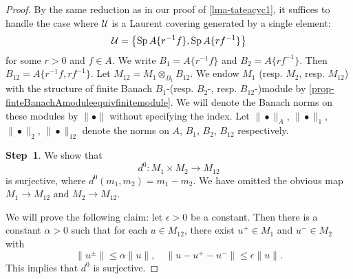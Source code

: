 \begin{proof}
    By the same reduction as in our proof of \cref{lma-tateacyc1}, it suffices to handle the case where $\mathcal{U}$ is a Laurent covering generated by a single element:
    \[
        \mathcal{U}=\left\{ \operatorname{Sp} A\{r^{-1}f\}, \operatorname{Sp} A\{rf^{-1}\} \right\}  
    \]
    for some $r>0$ and $f\in A$. We write $B_1= A\{r^{-1}f\}$ and $B_2=A\{rf^{-1}\}$. Then $B_{12}=A\{r^{-1}f,rf^{-1}\}$. Let $M_{12}=M_1\otimes_{B_1} B_{12}$.
    We endow $M_1$ (resp. $M_2$, resp. $M_{12}$) with the structure of finite Banach $B_1$-(resp. $B_2$-, resp. $B_{12}$-)module by \cref{prop-finteBanachAmoduleequivfinitemodule}. We will denote the Banach norms on these modules by $\|\bullet\|$ without specifying the index. Let $\|\bullet\|_A$, $\|\bullet\|_1$, $\|\bullet\|_2$, $\|\bullet\|_{12}$ denote the norms on $A$, $B_1$, $B_2$, $B_{12}$ respectively.

    \textbf{Step~1}. We show that 
    \[
        d^0:M_1\times M_2\rightarrow M_{12}
    \]
    is surjective, where $d^0(m_1,m_2)=m_1-m_2$. We have omitted the obvious map $M_1\rightarrow M_{12}$ and $M_2\rightarrow M_{12}$. 


    We will prove the following claim: let $\epsilon>0$ be a constant. Then there is a constant $\alpha>0$ such that for  each $u\in M_{12}$, there exist $u^+\in M_1$ and $u^-\in M_2$ with
    \[
        \|u^{\pm}\| \leq \alpha \|u\|, \quad \|u-u^+-u^-\|\leq \epsilon\|u\|.
    \]
    This implies that $d^0$ is surjective.


\end{proof}
